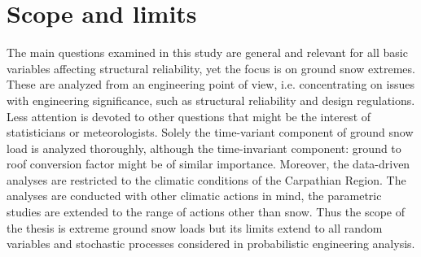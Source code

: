 %
%


\section{Scope and limits} 
\label{sec:scope}

The main questions examined in this study are general and relevant for all basic variables affecting structural reliability, yet the focus is on ground snow extremes. These are analyzed from an engineering point of view, i.e. concentrating on issues with engineering significance, such as structural reliability and design regulations. Less attention is devoted to other questions that might be the interest of statisticians or meteorologists. Solely the time-variant component of ground snow load is analyzed thoroughly, although the time-invariant component: ground to roof conversion factor might be of similar importance. Moreover, the data-driven analyses are restricted to the climatic conditions of the Carpathian Region. The analyses are conducted with other climatic actions in mind, the parametric studies are extended to the range of actions other than snow. Thus the scope of the thesis is extreme ground snow loads but its limits extend to all random variables and stochastic processes considered in probabilistic engineering analysis.

